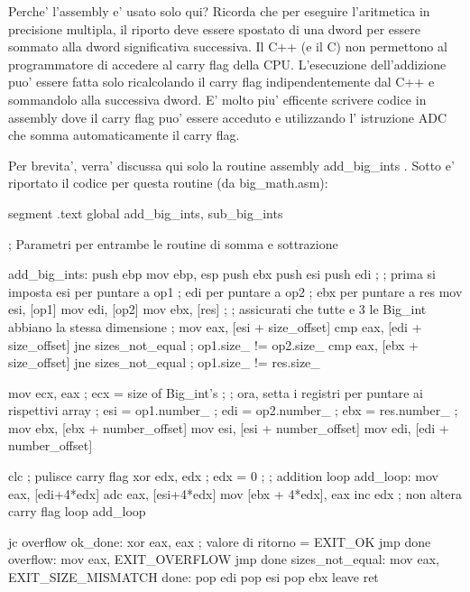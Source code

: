 Perche' l'assembly e' usato solo qui? Ricorda che per eseguire
l'aritmetica in precisione multipla, il riporto deve essere spostato
di una dword per essere sommato alla dword significativa successiva.
Il C++ (e il C) non permettono al programmatore di accedere al carry
flag della CPU. L'esecuzione dell'addizione puo' essere fatta solo
ricalcolando il carry flag indipendentemente dal C++ e sommandolo
alla successiva dword. E' molto piu' efficente scrivere codice in 
assembly dove il carry flag puo' essere acceduto e utilizzando l'
istruzione {\code ADC} che somma automaticamente il carry flag. 

Per brevita', verra' discussa qui solo la routine assembly {\code add\_big\_ints}
. Sotto e' riportato il codice per questa routine (da {\code big\_math.asm}):
\begin{AsmCodeListing}[label=big\_math.asm]
segment .text
        global  add_big_ints, sub_big_ints


; Parametri per entrambe le routine di somma e sottrazione

add_big_ints:
        push    ebp
        mov     ebp, esp
        push    ebx
        push    esi
        push    edi
        ;
        ; prima si imposta  esi per puntare a op1
        ;              edi per puntare a op2
        ;              ebx per puntare a res
        mov     esi, [op1]
        mov     edi, [op2]
        mov     ebx, [res]
        ;
        ; assicurati che tutte e 3 le Big_int abbiano la stessa dimensione
        ;
        mov     eax, [esi + size_offset]
        cmp     eax, [edi + size_offset]
        jne     sizes_not_equal                 ; op1.size_ != op2.size_
        cmp     eax, [ebx + size_offset]
        jne     sizes_not_equal                 ; op1.size_ != res.size_

        mov     ecx, eax                        ; ecx = size of Big_int's
        ;
        ; ora, setta i registri per puntare ai rispettivi array
        ;      esi = op1.number_
        ;      edi = op2.number_
        ;      ebx = res.number_
        ;
        mov     ebx, [ebx + number_offset]
        mov     esi, [esi + number_offset]
        mov     edi, [edi + number_offset]
        
        clc                               ; pulisce carry flag
        xor     edx, edx                  ; edx = 0
        ;
        ; addition loop
add_loop:
        mov     eax, [edi+4*edx]
        adc     eax, [esi+4*edx]
        mov     [ebx + 4*edx], eax
        inc     edx                       ; non altera carry flag
        loop    add_loop

        jc      overflow
ok_done:
        xor     eax, eax                  ; valore di ritorno = EXIT_OK
        jmp     done
overflow:
        mov     eax, EXIT_OVERFLOW
        jmp     done
sizes_not_equal:
        mov     eax, EXIT_SIZE_MISMATCH
done:
        pop     edi
        pop     esi
        pop     ebx
        leave
        ret
\end{AsmCodeListing}

